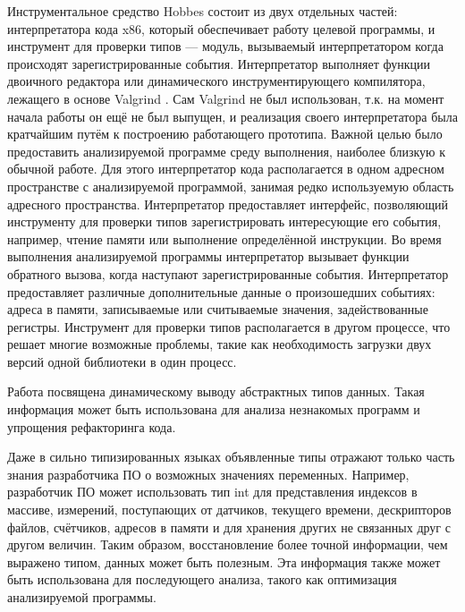 \documentclass[a4paper,12pt,russian]{article}
\newcommand{\code}[1]{\textsf{#1}}
\begin{document}
Инструментальное средство \code{Hobbes} состоит из двух отдельных частей: интерпретатора кода \code{x86}, который обеспечивает работу целевой программы, и инструмент для проверки типов --- модуль, вызываемый интерпретатором когда происходят зарегистрированные события.
Интерпретатор выполняет функции двоичного редактора или динамического инструментирующего компилятора, лежащего в основе \code{Valgrind} \cite{valgrind}. Сам \code{Valgrind} не был использован, т.к. на момент начала работы он ещё не был выпущен, и реализация своего интерпретатора была кратчайшим путём к построению работающего прототипа.
Важной целью было предоставить анализируемой программе среду выполнения, наиболее близкую к обычной работе.
Для этого интерпретатор кода располагается в одном адресном пространстве с анализируемой программой, занимая редко используемую область адресного пространства.
Интерпретатор предоставляет интерфейс, позволяющий инструменту для проверки типов зарегистрировать интересующие его события, например, чтение памяти или выполнение определённой инструкции.
Во время выполнения анализируемой программы интерпретатор вызывает функции обратного вызова, когда наступают зарегистрированные события.
Интерпретатор предоставляет различные дополнительные данные о произошедших событиях: адреса в памяти, записываемые или считываемые значения, задействованные регистры.
Инструмент для проверки типов располагается в другом процессе, что решает многие возможные проблемы, такие как необходимость загрузки двух версий одной библиотеки в один процесс.

Работа \cite{abstracttypes} посвящена динамическому выводу абстрактных типов данных.
Такая информация может быть использована для анализа незнакомых программ и упрощения рефакторинга кода.

Даже в сильно типизированных языках объявленные типы отражают только часть знания разработчика ПО о возможных значениях переменных.
Например, разработчик ПО может использовать тип \code{int} для представления индексов в массиве, измерений, поступающих от датчиков, текущего времени, дескрипторов файлов, счётчиков, адресов в памяти и для хранения других не связанных друг с другом величин.
Таким образом, восстановление более точной информации, чем выражено типом, данных может быть полезным.
Эта информация также может быть использована для последующего анализа, такого как оптимизация анализируемой программы.
\end{document}
